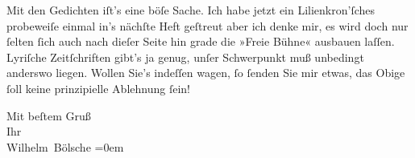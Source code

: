 \pstart
           Mit den Gedichten iſt’s eine böſe Sache. Ich habe jetzt ein Lilienkron’ſches probeweiſe einmal
               in’s nächſte Heft geſtreut {\pb}aber ich denke mir, es
               wird doch nur{ }ſelten{ }ſich auch nach dieſer Seite hin grade die »Freie Bühne« ausbauen laſſen. Lyriſche Zeitſchriften gibt’s ja
               genug, unſer Schwerpunkt muß unbedingt anderswo liegen. Wollen Sie’s indeſſen wagen,{ }ſo{ }ſenden Sie mir etwas, das Obige{ }ſoll keine prinzipielle Ablehnung{ }ſein!\pend
           
\pstart
           Mit beſtem Gruß{\\[\baselineskip]}Ihr{\\[\baselineskip]}\spacefill\mbox{Wilhelm Bölsche}\pend
           \leftskip=0em{}\endnumbering{}  \newcommand{\dateiname}{L00087}\newcommand{\titel}{Wilhelm Bölsche an Arthur Schnitzler, 24. 3. 1892}\newcommand{\editorInnen}{Martin Anton Müller und Gerd-Hermann Susen}
